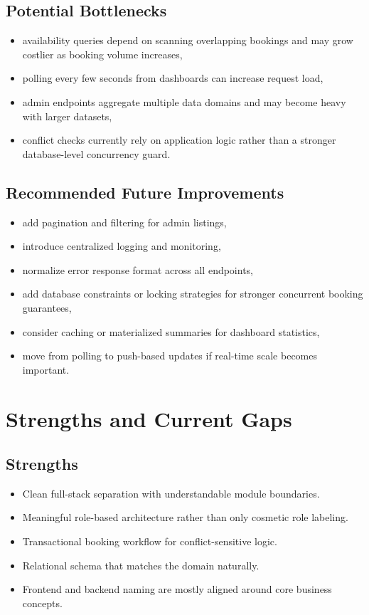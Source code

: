 \documentclass[12pt,a4paper]{article}
\begin{document}
\subsection{Potential Bottlenecks}
\begin{itemize}
    \item availability queries depend on scanning overlapping bookings and may grow costlier as booking volume increases,
    \item polling every few seconds from dashboards can increase request load,
    \item admin endpoints aggregate multiple data domains and may become heavy with larger datasets,
    \item conflict checks currently rely on application logic rather than a stronger database-level concurrency guard.
\end{itemize}

\subsection{Recommended Future Improvements}
\begin{itemize}
    \item add pagination and filtering for admin listings,
    \item introduce centralized logging and monitoring,
    \item normalize error response format across all endpoints,
    \item add database constraints or locking strategies for stronger concurrent booking guarantees,
    \item consider caching or materialized summaries for dashboard statistics,
    \item move from polling to push-based updates if real-time scale becomes important.
\end{itemize}

\section{Strengths and Current Gaps}
\subsection{Strengths}
\begin{itemize}
    \item Clean full-stack separation with understandable module boundaries.
    \item Meaningful role-based architecture rather than only cosmetic role labeling.
    \item Transactional booking workflow for conflict-sensitive logic.
    \item Relational schema that matches the domain naturally.
    \item Frontend and backend naming are mostly aligned around core business concepts.
\end{itemize}
\end{document}
